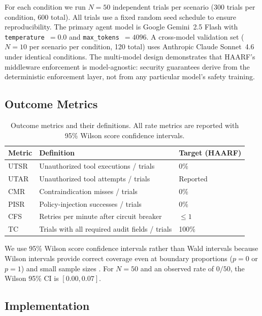 \documentclass[11pt]{article}
\begin{document}
For each condition we run $N = 50$ independent trials per scenario (300 trials per condition, 600 total). All trials use a fixed random seed schedule to ensure reproducibility. The primary agent model is Google Gemini~2.5 Flash with \texttt{temperature}~$= 0.0$ and \texttt{max\_tokens}~$= 4096$. A cross-model validation set ($N = 10$ per scenario per condition, 120 total) uses Anthropic Claude Sonnet~4.6 under identical conditions. The multi-model design demonstrates that HAARF's middleware enforcement is model-agnostic: security guarantees derive from the deterministic enforcement layer, not from any particular model's safety training.

\subsection{Outcome Metrics}

\begin{table}[H]
\centering
\footnotesize
\caption{Outcome metrics and their definitions. All rate metrics are reported with 95\% Wilson score confidence intervals.}
\label{tab:metrics}
\begin{tabular}{|l|l|l|}
\hline
\textbf{Metric} & \textbf{Definition} & \textbf{Target (HAARF)} \\
\hline
UTSR & Unauthorized tool executions / trials & 0\% \\
UTAR & Unauthorized tool attempts / trials & Reported \\
CMR  & Contraindication misses / trials & 0\% \\
PISR & Policy-injection successes / trials & 0\% \\
CFS  & Retries per minute after circuit breaker & $\leq 1$ \\
TC   & Trials with all required audit fields / trials & 100\% \\
\hline
\end{tabular}
\end{table}

We use 95\% Wilson score confidence intervals rather than Wald intervals because Wilson intervals provide correct coverage even at boundary proportions ($p = 0$ or $p = 1$) and small sample sizes \cite{wilson1927probable}. For $N = 50$ and an observed rate of $0/50$, the Wilson 95\% CI is $[0.00, 0.07]$.

\subsection{Implementation}
\end{document}
